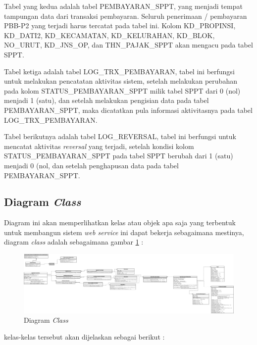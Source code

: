 \documentclass[pdftex,12pt, oneside]{article}
\begin{document}
Tabel yang kedua adalah tabel PEMBAYARAN\_SPPT, yang menjadi tempat tampungan data dari transaksi pembayaran. Seluruh penerimaan / pembayaran PBB-P2 yang terjadi harus tercatat pada tabel ini. Kolom KD\_PROPINSI, KD\_DATI2, KD\_KECAMATAN, KD\_KELURAHAN, KD\_BLOK, NO\_URUT, KD\_JNS\_OP, dan THN\_PAJAK\_SPPT akan mengacu pada tabel SPPT.

Tabel ketiga adalah tabel LOG\_TRX\_PEMBAYARAN, tabel ini berfungsi untuk melakukan pencatatan aktivitas sistem, setelah melakukan perubahan pada kolom STATUS\_PEMBAYARAN\_SPPT milik tabel SPPT dari 0 (nol) menjadi 1 (satu), dan setelah melakukan pengisian data pada tabel PEMBAYARAN\_SPPT, maka dicatatkan pula informasi aktivitasnya pada tabel LOG\_TRX\_PEMBAYARAN.

Tabel berikutnya adalah tabel LOG\_REVERSAL, tabel ini berfungsi untuk mencatat aktivitas \textit{reversal} yang terjadi, setelah kondisi kolom STATUS\_PEMBAYARAN\_SPPT pada tabel SPPT berubah dari 1 (satu) menjadi 0 (nol, dan setelah penghapusan data pada tabel PEMBAYARAN\_SPPT.

\subsection{Diagram \textit{Class}}

Diagram ini akan memperlihatkan kelas atau objek apa saja yang terbentuk untuk membangun sistem \textit{web service} ini dapat bekerja sebagaimana mestinya, diagram \textit{class} adalah sebagaimana gambar \ref{fig:uml-class} :

\begin{figure}[H]
  \centering
  \includegraphics[width=1\textwidth]{./resources/diagram/uml-class}
  \caption{Diagram \textit{Class}}
  \label{fig:uml-class}
\end{figure}

kelas-kelas tersebut akan dijelaskan sebagai berikut :
\end{document}
